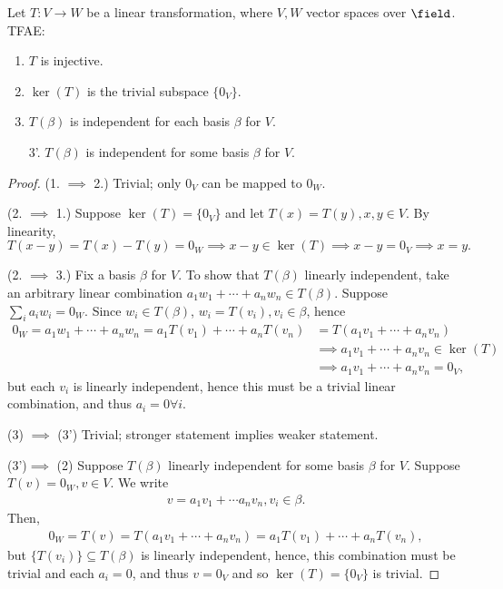 \begin{proposition}
    Let $T : V \to W$ be a linear transformation, where $V, W$ vector spaces over $\field$. TFAE:
    \begin{enumerate}
        \item $T$ is injective.
        \item $\ker(T)$ is the trivial subspace $\{0_V\}$.
        \item $T(\beta)$ is independent for each basis $\beta$ for $V$.
        \item[3'.] $T(\beta)$ is independent for some basis $\beta$ for $V$. 
    \end{enumerate}
\end{proposition}

\begin{proof}
    (1. $\implies$ 2.) Trivial; only $0_V$ can be mapped to $0_W$.

    \noindent (2. $\implies$ 1.) Suppose $\ker (T) = \{0_V\}$ and let $T(x) = T(y), x, y \in V$. By linearity,
    \[
        T(x - y) = T(x) - T(y) = 0_W \implies x - y \in \ker (T) \implies x - y = 0_V \implies x= y.
    \]

    \noindent (2. $\implies$ 3.) Fix a basis $\beta$ for $V$. To show that $T(\beta)$ linearly independent, take an arbitrary linear combination $a_1w_1 + \cdots + a_n w_n \in T(\beta)$. Suppose $\sum_i a_i w_i = 0_W$. Since $w_i \in T(\beta)$, $w_i = T(v_i), v_i \in \beta$, hence \begin{align*}
            0_W = a_1 w_1 + \cdots + a_n w_n = a_1 T(v_1) + \cdots + a_n T(v_n) &= T(a_1 v_1 + \cdots + a_n v_n)\\
            &\implies a_1v_1 + \cdots + a_n v_n \in \ker (T)\\
            &\implies a_1v_1 + \cdots + a_n v_n = 0_V,
    \end{align*}
    but each $v_i$ is linearly independent, hence this must be a trivial linear combination, and thus $a_i = 0 \forall i$.

    \noindent(3) $\implies$ (3') Trivial; stronger statement implies weaker statement.

    \noindent (3')$\implies$ (2) Suppose $T(\beta)$ linearly independent for some basis $\beta$ for $V$. Suppose $T(v) = 0_W, v \in V$. We write \begin{align*}
        v = a_1 v_1 + \cdots a_n v_n, v_i \in \beta.
    \end{align*}
    Then, \begin{align*}
        0_W = T(v) = T(a_1 v_1 + \cdots + a_n v_n) = a_1 T(v_1) + \cdots + a_n T(v_n),
    \end{align*}
    but $\{T(v_i)\} \subseteq T(\beta)$ is linearly independent, hence, this combination must be trivial and each $a_i = 0$, and thus $v = 0_V$ and so $\ker (T) = \{0_V\}$ is trivial. 
\end{proof}

